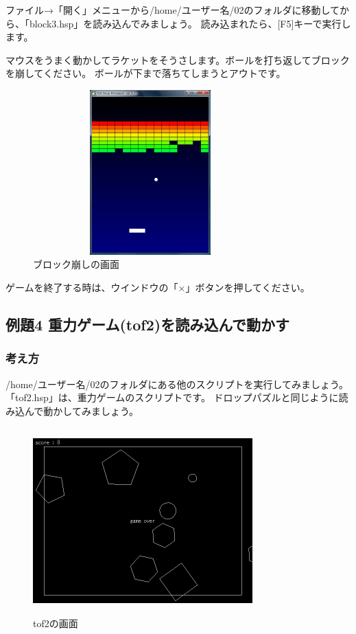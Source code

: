 ファイル→「開く」メニューから/home/ユーザー名/02のフォルダに移動してから、「block3.hsp」を読み込んでみましょう。
読み込まれたら、[F5]キーで実行します。

マウスをうまく動かしてラケットをそうさします。ボールを打ち返してブロックを崩してください。
ボールが下まで落ちてしまうとアウトです。

\begin{figure}[H]
  \begin{center}
    \includegraphics[keepaspectratio,width=9.049cm,height=6.346cm]{images/chap02/text02-img016.png}
    \caption{ブロック崩しの画面}
  \end{center}
  \label{fig:block_display}
\end{figure}

ゲームを終了する時は、ウインドウの「×」ボタンを押してください。
\clearpage

% 
% 
% 
\subsection{例題4 重力ゲーム(tof2)を読み込んで動かす}

\subsubsection*{考え方}

/home/ユーザー名/02のフォルダにある他のスクリプトを実行してみましょう。
「tof2.hsp」は、重力ゲームのスクリプトです。
ドロップパズルと同じように読み込んで動かしてみましょう。

\begin{figure}[H]
  \begin{center}
    \includegraphics[keepaspectratio,width=8.467cm,height=7.17cm]{images/chap02/s_tof2.png}
    \caption{tof2の画面}
  \end{center}
  \label{fig:tof2}
\end{figure}

